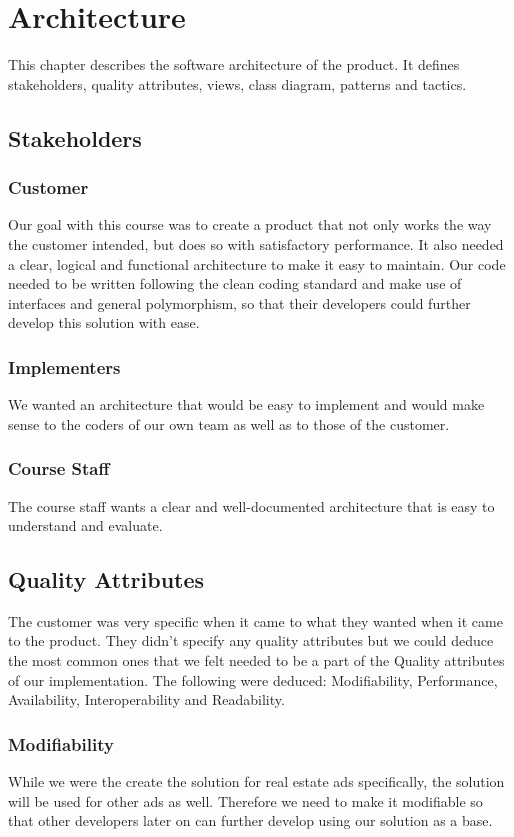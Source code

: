 \chapter{Architecture}
\label{Architecture}
This chapter describes the software architecture of the product. It defines stakeholders, quality attributes, views, class diagram, patterns and tactics.
\newpage

\section{Stakeholders}

\subsection{Customer}
Our goal with this course was to create a product that not only works the way the customer intended, but does so with satisfactory performance. It also needed a clear, logical and functional architecture to make it easy to maintain. 
Our code needed to be written following the clean coding standard and make use of interfaces and general polymorphism, so that their developers could further develop this solution with ease.

\subsection{Implementers}
We wanted an architecture that would be easy to implement and would make sense to the coders of our own team as well as to those of the customer.

\subsection{Course Staff}
The course staff wants a clear and well-documented architecture that is easy to understand and evaluate.


\section{Quality Attributes}
The customer was very specific when it came to what they wanted when it came to the product. They didn't specify any quality attributes but we could deduce the most common ones that we felt needed to be a part of the Quality attributes of our implementation. The following were deduced: Modifiability, Performance, Availability, Interoperability and Readability. 

\subsection{Modifiability}
While we were the create the solution for real estate ads specifically, the solution will be used for other ads as well. Therefore we need to make it modifiable so that other developers later on can further develop using our solution as a base.

